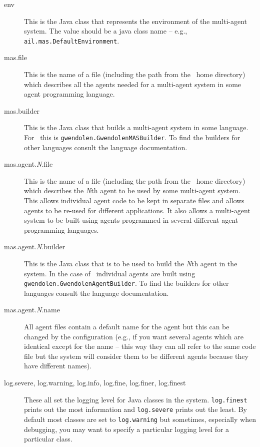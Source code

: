 \begin{description}
\item[env] This is the Java class that represents the environment of the multi-agent system.  The value should be a java class name -- e.g., \texttt{ail.mas.DefaultEnvironment}.
\item[mas.file] This is the name of a file (including the path from the \mcapl\ home directory) which describes all the agents needed for a multi-agent system in some agent programming language.
\item[mas.builder] This is the Java class that builds a multi-agent system in some language.  For \gwendolen\ this is \texttt{gwendolen.GwendolenMASBuilder}.  To find the builders for other languages consult the language documentation.
\item[mas.agent.\emph{N}.file] This is the name of a file (including the path from the \mcapl\ home directory) which describes the \emph{N}th agent to be used by some multi-agent system.  This allows individual agent code to be kept in separate files and allows agents to be re-used for different applications.  It also allows a multi-agent system to be built using agents programmed in several different agent programming languages.
\item[mas.agent.\emph{N}.builder] This is the Java class that is to be used to build the \emph{N}th agent in the system.  In the case of \gwendolen\ individual agents are built using \texttt{gwendolen.GwendolenAgentBuilder}.  To find the builders for other languages consult the language documentation.
\item[mas.agent.\emph{N}.name] All agent files contain a default name for the agent but this can be changed by the configuration (e.g., if you want several agents which are identical except for the name -- this way they can all refer to the same code file but the system will consider them to be different agents because they have different names).
\item[log.severe, log.warning, log.info, log.fine, log.finer, log.finest] These all set the logging level for Java classes in the system.  \texttt{log.finest} prints out the most information and \texttt{log.severe} prints out the least.  By default most classes are set to \texttt{log.warning} but sometimes, especially when debugging, you may want to specify a particular logging level for a particular class. 

\end{description}
